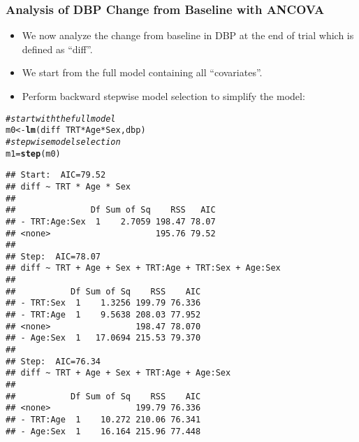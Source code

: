 \documentclass[table,10pt]{beamer}\usepackage[]{graphicx}\usepackage[]{color}
\makeatletter
\newcommand{\hlcom}[1]{\textcolor[rgb]{0.678,0.584,0.686}{\textit{#1}}}%
\newcommand{\hlopt}[1]{\textcolor[rgb]{0,0,0}{#1}}%
\newcommand{\hlstd}[1]{\textcolor[rgb]{0.345,0.345,0.345}{#1}}%
\newcommand{\hlkwb}[1]{\textcolor[rgb]{0.69,0.353,0.396}{#1}}%
\newcommand{\hlkwd}[1]{\textcolor[rgb]{0.737,0.353,0.396}{\textbf{#1}}}%
\newenvironment{kframe}{%
 \def\at@end@of@kframe{}%
 \ifinner\ifhmode%
  \def\at@end@of@kframe{\end{minipage}}%
  \begin{minipage}{\columnwidth}%
 \fi\fi%
 \def\FrameCommand##1{\hskip\@totalleftmargin \hskip-\fboxsep
 \colorbox{shadecolor}{##1}\hskip-\fboxsep
     \hskip-\linewidth \hskip-\@totalleftmargin \hskip\columnwidth}%
 \MakeFramed {\advance\hsize-\width
   \@totalleftmargin\z@ \linewidth\hsize
   \@setminipage}}%
 {\par\unskip\endMakeFramed%
 \at@end@of@kframe}
\newenvironment{knitrout}{}{} %
\makeatother
\begin{document}
\begin{CJK*}{UTF8}{gbsn}
\begin{frame}[t,containsverbatim]
\frametitle{Analysis of DBP Change from Baseline with ANCOVA}
\begin{itemize}
	\item We now analyze the change from baseline in DBP at the 
		end of trial which is defined as ``diff''.
	\item We start from the full model containing all 
		``covariates''.
	\item Perform backward stepwise model selection to simplify 
		the model:  
\end{itemize}
\begin{knitrout}\footnotesize
{}\color{fgcolor}\begin{kframe}
\begin{alltt}
\hlcom{# start with the full model}
\hlstd{m0} \hlkwb{<-} \hlkwd{lm}\hlstd{(diff} \hlopt{~} \hlstd{TRT}\hlopt{*}\hlstd{Age}\hlopt{*}\hlstd{Sex, dbp)}
\hlcom{# stepwise model selection}
\hlstd{m1} \hlkwb{=} \hlkwd{step}\hlstd{(m0)}
\end{alltt}
\begin{verbatim}
## Start:  AIC=79.52
## diff ~ TRT * Age * Sex
## 
##               Df Sum of Sq    RSS   AIC
## - TRT:Age:Sex  1    2.7059 198.47 78.07
## <none>                     195.76 79.52
## 
## Step:  AIC=78.07
## diff ~ TRT + Age + Sex + TRT:Age + TRT:Sex + Age:Sex
## 
##           Df Sum of Sq    RSS    AIC
## - TRT:Sex  1    1.3256 199.79 76.336
## - TRT:Age  1    9.5638 208.03 77.952
## <none>                 198.47 78.070
## - Age:Sex  1   17.0694 215.53 79.370
## 
## Step:  AIC=76.34
## diff ~ TRT + Age + Sex + TRT:Age + Age:Sex
## 
##           Df Sum of Sq    RSS    AIC
## <none>                 199.79 76.336
## - TRT:Age  1    10.272 210.06 76.341
## - Age:Sex  1    16.164 215.96 77.448
\end{verbatim}
\end{kframe}
\end{knitrout}
\end{frame}



\end{CJK*}
\end{document}
